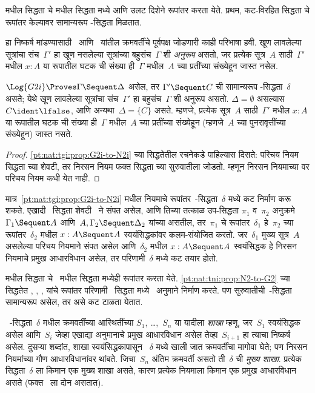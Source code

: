  मधील सिद्धता चे  मधील सिद्धता मध्ये
आणि उलट दिशेने रूपांतर करता येते. प्रथम,
कट-विरहित  सिद्धता चे रूपांतर केल्यावर
सामान्यरूप -सिद्धता मिळतात.

हा निष्कर्ष मांडण्यासाठी~ आणि~
यांतील क्रमवर्तींचे पूर्वपक्ष जोडणारी काही परिभाषा हवी.
खूण लावलेल्या सूत्रांचा संच~$\Gamma'$ हा खूण नसलेल्या
सूत्रांच्या बहुसंच~$\Gamma$ शी \emph{अनुरूप} असतो,
जर प्रत्येक सूत्र~$A$ साठी~$\Gamma'$ मधील
$x : A$ या रूपातील घटक ची संख्या ही~$\Gamma$
मधील~$A$ च्या प्रतींच्या संख्येहून जास्त नसेल.

\begin{cor}
$\Log{G2i} \Proves \Gamma \Sequent \Delta$ असेल, तर
$\Gamma' \Sequent C$ ची सामान्यरूप
-सिद्धता~$\delta$ असते; येथे खूण लावलेल्या
सूत्रांचा संच~$\Gamma'$ हा बहुसंच~$\Gamma$ शी अनुरूप असतो.
$\Delta=\emptyset$ असल्यास~$C\ident\lfalse$,
आणि अन्यथा~$\Delta=\{C\}$ असते.
म्हणजे, प्रत्येक सूत्र~$A$ साठी~$\Gamma'$ मधील
$x : A$ या रूपातील घटक ची संख्या ही~$\Gamma$
मधील~$A$ च्या प्रतींच्या संख्येहून (म्हणजे~$A$ च्या
पुनरावृत्तींच्या संख्येहून) जास्त नसते.
\end{cor}

\begin{proof}
\ref{pt:nat:tgi:prop:G2i-to-N2i} च्या सिद्धतेतील
रचनेकडे पाहिल्यास दिसते: परिचय नियम
सिद्धता च्या शेवटी, तर निरसन नियम
फक्त सिद्धता च्या सुरुवातीला जोडतो.
म्हणून निरसन नियमाच्या वर परिचय
नियम कधी येत नाही.
\end{proof}

मात्र~\ref{pt:nat:tgi:prop:G2i-to-N2i} मधील
\Cut{} नियमाचे रूपांतर~-सिद्धता~$\delta$ मध्ये
कट निर्माण करू शकते. एखादी~ सिद्धता
शेवटी~\Cut{} ने संपत असेल, आणि तिच्या तत्काळ उप-सिद्धता
$\pi_1$ व~$\pi_2$ अनुक्रमे~$\Gamma_1 \Sequent A$
आणि~$A, \Gamma_2 \Sequent \Delta_2$ यांच्या असतील,
तर~$\pi_1$ चे रूपांतर~$\delta_1$ हे~$\pi_2$ च्या
रूपांतर~$\delta_2$ मधील $x:A \Sequent A$
स्वयंसिद्धकांवर कलम-संयोजित करतो. जर~$\delta_1$
मुख्य सूत्र~$A$ असलेल्या परिचय
नियमाने संपत असेल आणि~$\delta_2$ मधील
$x:A \Sequent A$ स्वयंसिद्धक हे निरसन
नियमाचे प्रमुख आधारविधान असेल, तर परिणामी~$\delta$
मध्ये कट तयार होतो.

 मधील सिद्धता चे~ मधील
सिद्धता मध्येही रूपांतर करता येते.
\ref{pt:nat:tni:prop:N2-to-G2} च्या सिद्धतेत
\Elim{\land}, \Elim{\lif}, \Elim{\lnot},
\Elim{\lforall} यांचे रूपांतर परिणामी~
सिद्धता मध्ये~\Cut{} अनुमाने निर्माण करते.
पण सुरुवातीची~-सिद्धता सामान्यरूप असेल,
तर असे कट टाळता येतात.

~-सिद्धता~$\delta$ मधील
क्रमवर्तींच्या आस्थितींच्या $S_1$, \dots,~$S_n$
या यादीला \emph{शाखा} म्हणू, जर~$S_1$ स्वयंसिद्धक
असेल आणि~$S_i$ जेव्हा एखाद्या अनुमानाचे प्रमुख
आधारविधान असेल तेव्हा~$S_{i+1}$ हा त्याचा निष्कर्ष
असेल. दुसऱ्या शब्दांत, शाखा स्वयंसिद्धकापासून
~$\delta$ मध्ये खाली जात क्रमवर्तींचा मागोवा घेते;
पण निरसन नियमांच्या गौण आधारविधानांवर थांबते.
जिचा~$S_n$ अंतिम क्रमवर्ती असतो ती~$\delta$ ची
\emph{मुख्य शाखा}. प्रत्येक सिद्धता~$\delta$ ला
किमान एक मुख्य शाखा असते, कारण प्रत्येक नियमाला
किमान एक प्रमुख आधारविधान असते (फक्त~\Intro{\land}
ला दोन असतात).

